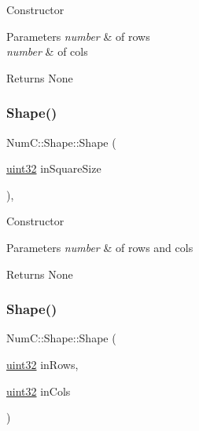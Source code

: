 Constructor


\begin{DoxyParams}{Parameters}
{\em number} & of rows \\
\hline
{\em number} & of cols\\
\hline
\end{DoxyParams}
\begin{DoxyReturn}{Returns}
None 
\end{DoxyReturn}
\mbox{\label{class_num_c_1_1_shape_a2376c8ccff2c2594ce9afe7d9ca5d42d}} 
\subsubsection{\texorpdfstring{Shape()}{Shape()}\hspace{0.1cm}{\footnotesize\ttfamily [2/3]}}
{\footnotesize\ttfamily Num\+C\+::\+Shape\+::\+Shape (\begin{DoxyParamCaption}\item[{\mbox{\hyperlink{namespace_num_c_ae685802ca6d3035f2b400b081e3953fa}{uint32}}}]{in\+Square\+Size }\end{DoxyParamCaption})\hspace{0.3cm}{\ttfamily [inline]}, {\ttfamily [explicit]}}

Constructor


\begin{DoxyParams}{Parameters}
{\em number} & of rows and cols\\
\hline
\end{DoxyParams}
\begin{DoxyReturn}{Returns}
None 
\end{DoxyReturn}
\mbox{\label{class_num_c_1_1_shape_aa669d346c90edad6d7ce6f2b9a481eda}} 
\subsubsection{\texorpdfstring{Shape()}{Shape()}\hspace{0.1cm}{\footnotesize\ttfamily [3/3]}}
{\footnotesize\ttfamily Num\+C\+::\+Shape\+::\+Shape (\begin{DoxyParamCaption}\item[{\mbox{\hyperlink{namespace_num_c_ae685802ca6d3035f2b400b081e3953fa}{uint32}}}]{in\+Rows,  }\item[{\mbox{\hyperlink{namespace_num_c_ae685802ca6d3035f2b400b081e3953fa}{uint32}}}]{in\+Cols }\end{DoxyParamCaption})\hspace{0.3cm}{\ttfamily [inline]}}

